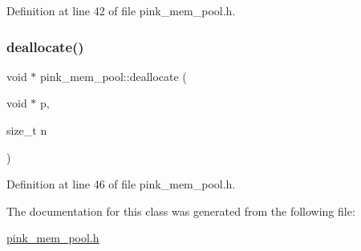 Definition at line 42 of file pink\+\_\+mem\+\_\+pool.\+h.

\mbox{\label{classpink__mem__pool_a4558b3b63009b917441d763619eeb4f4}} 
\subsubsection{\texorpdfstring{deallocate()}{deallocate()}}
{\footnotesize\ttfamily void $\ast$ pink\+\_\+mem\+\_\+pool\+::deallocate (\begin{DoxyParamCaption}\item[{void $\ast$}]{p,  }\item[{size\+\_\+t}]{n }\end{DoxyParamCaption})\hspace{0.3cm}{\ttfamily [static]}}



Definition at line 46 of file pink\+\_\+mem\+\_\+pool.\+h.



The documentation for this class was generated from the following file\+:\begin{DoxyCompactItemize}
\item 
\hyperlink{pink__mem__pool_8h}{pink\+\_\+mem\+\_\+pool.\+h}\end{DoxyCompactItemize}
